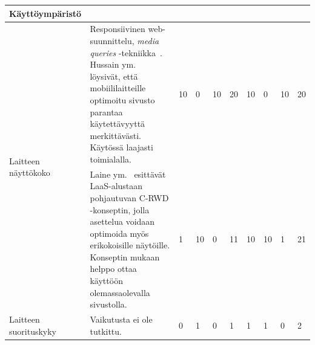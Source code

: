 \documentclass[finnish, 12pt, a4paper, elec, utf8, a-1b, online]{aaltothesis}
\begin{document}
{\begin{longtable}{p{2.5cm}|p{6cm}|p{0.5cm}p{0.5cm}p{0.5cm}|p{0.5cm}|p{0.5cm}p{0.5cm}p{0.5cm}|p{0.5cm}|}
    \midrule
    \textbf{Käyttöympäristö}                                                                                                                                                                                                                                                                                                                                                                                                                                                                                                                                                                                                                                                                                                                              \\
    \midrule
    \multirow[t]{2}{*}{Laitteen näyttökoko} & Responsiivinen web-suunnittelu, \textit{media queries} -tekniikka~\cite{Rivoal:12:MQ}. Hussain ym.~\cite{WOS:000218608600006} löysivät, että mobiililaitteille optimoitu sivusto parantaa käytettävyyttä merkittävästi. Käytössä laajasti toimialalla.                                                                                                                  & 10                                         & 0                                   & 10                                     & 20                           & 10                                              & 0                                         & 10                                        & 20                           \\\cline{2-10}
                                            & Laine ym.~\cite{laine2021responsive} esittävät LaaS-alustaan pohjautuvan C-RWD -konseptin, jolla asettelua voidaan optimoida myös erikokoisille näytöille. Konseptin mukaan helppo ottaa käyttöön olemassaolevalla sivustolla.                                                                                                                                    & 1                                          & 10                                  & 0                                      & 11                           & 10                                              & 10                                        & 1                                         & 21                           \\
    \midrule
    Laitteen suorituskyky                   & Vaikutusta ei ole tutkittu.                                                                                                                                                                                                                                                                                                                                             & 0                                          & 1                                   & 0                                      & 1                            & 1                                               & 1                                         & 0                                         & 2                            \\

\end{longtable}}
\end{document}
